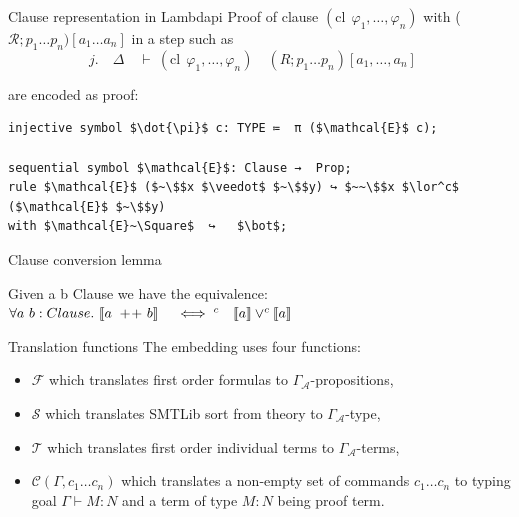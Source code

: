 \documentclass[aspectratio=169,xcolor={dvipsnames}]{beamer}
\begin{document}
\begin{frame}[t,fragile]{Clause representation in Lambdapi}
Proof of clause $(\text{cl}~~\varphi_1, \dots ,\varphi_n)$ with ($\mathcal{R}; p_1 \dots p_n)[a_1 \dots a_n]$ in a step such as
\begin{equation*}
    j. \quad  \Delta \quad \vdash~ (\text{cl}~~\varphi_1, \dots ,\varphi_n) \quad (R; p_1 \dots p_n)[a_1, \dots, a_n]\quad
\end{equation*}

are encoded as proof:
\begin{lstlisting}[mathescape=true]
injective symbol $\dot{\pi}$ c: TYPE ≔  π ($\mathcal{E}$ c);

sequential symbol $\mathcal{E}$: Clause →  Prop;
rule $\mathcal{E}$ ($~\$$x $\veedot$ $~\$$y) ↪ $~~\$$x $\lor^c$ ($\mathcal{E}$ $~\$$y)
with $\mathcal{E}~\Square$  ↪   $\bot$;
\end{lstlisting}
\end{frame}

\begin{frame}{Clause conversion lemma}
\begin{lemma}
Given a b Clause we have the equivalence:\\
$\forall a~b: Clause.~ \llbracket a ~+\!+~ b \rrbracket \quad \iff^c \quad \llbracket a \rrbracket \lor^c \llbracket a \rrbracket $
\end{lemma}
\end{frame}


\begin{frame}{Translation functions}
    The embedding uses four functions:
    \begin{itemize}
        \item $\mathcal{F}$ which translates first order formulas to $\Gamma_\mathcal{A}$-propositions,
        \item $\mathcal{S}$ which translates SMTLib sort from theory to $\Gamma_\mathcal{A}$-type,
        \item $\mathcal{T}$ which translates first order individual terms to $\Gamma_\mathcal{A}$-terms,
        \item $\mathcal{C}(\Gamma, c_1 \dots c_n)$ which translates a non-empty set of commands $c_1 \dots c_n$ to typing goal $\Gamma \vdash M: N$ and a term of type $M: N$ being proof term.
    \end{itemize}
\end{frame}
\end{document}
